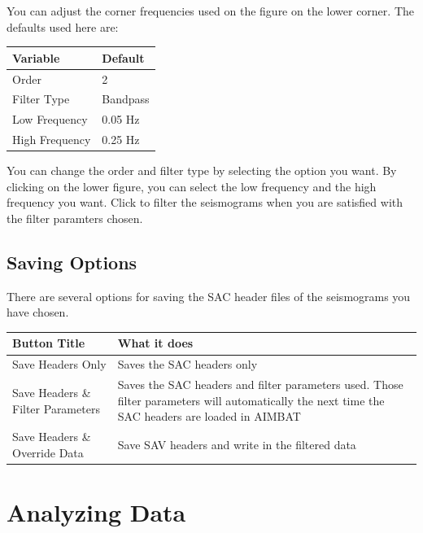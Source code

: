 \documentclass[letterpaper,10pt,english]{sphinxmanual}
\begin{document}
You can adjust the corner frequencies used on the figure on the lower corner. The defaults used here are:

\begin{tabulary}{\linewidth}{|L|L|}
\hline
\textsf{\relax 
Variable
} & \textsf{\relax 
Default
}\\
\hline
Order
 & 
2
\\

Filter Type
 & 
Bandpass
\\

Low Frequency
 & 
0.05 Hz
\\

High Frequency
 & 
0.25 Hz
\\
\hline\end{tabulary}


You can change the order and filter type by selecting the option you want. By clicking on the lower figure, you can select the low frequency and the high frequency you want. Click  to filter the seismograms when you are satisfied with the filter paramters chosen.


\section{Saving Options}
\label{docfiles/filteringData:saving-options}
There are several options for saving the SAC header files of the seismograms you have chosen.

\begin{tabulary}{\linewidth}{|L|L|}
\hline
\textsf{\relax 
Button Title
} & \textsf{\relax 
What it does
}\\
\hline
Save Headers Only
 & 
Saves the SAC headers only
\\

Save Headers \& Filter Parameters
 & 
Saves the SAC headers and filter parameters used.
Those filter parameters will automatically the
next time the SAC headers are loaded in AIMBAT
\\

Save Headers \& Override Data
 & 
Save SAV headers and write in the filtered data
\\
\hline\end{tabulary}



\chapter{Analyzing Data}
\label{docfiles/analyzingData:analyzing-data}\label{docfiles/analyzingData::doc}
\end{document}
